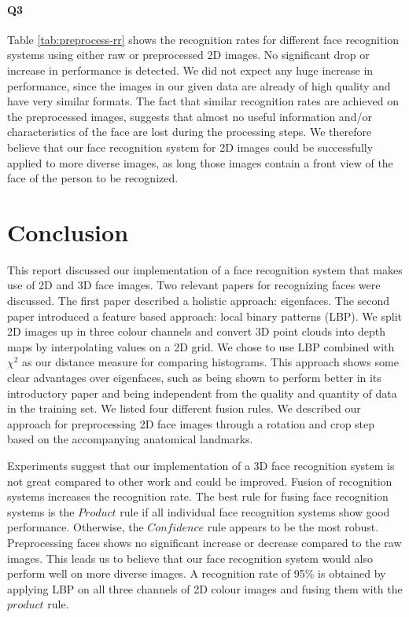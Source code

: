\documentclass[]{article}
\begin{document}
\paragraph{Q3}
Table \ref{tab:preprocess-rr} shows the recognition rates for different face recognition systems using either raw or preprocessed 2D images. No significant drop or increase in performance is detected. We did not expect any huge increase in performance, since the images in our given data are already of high quality and have very similar formats. The fact that similar recognition rates are achieved on the preprocessed images, suggests that almost no useful information and/or characteristics of the face are lost during the processing steps. We therefore believe that our face recognition system for 2D images could be successfully applied to more diverse images, as long those images contain a front view of the face of the person to be recognized.

\section{Conclusion}
This report discussed our implementation of a face recognition system that makes use of 2D and 3D face images. Two relevant papers for recognizing faces were discussed. The first paper described a holistic approach: eigenfaces. The second paper introduced a feature based approach: local binary patterns (LBP). We split 2D images up in three colour channels and convert 3D point clouds into depth maps by interpolating values on a 2D grid. We chose to use LBP combined with $\chi^2$ as our distance measure for comparing histograms. This approach shows some clear advantages over eigenfaces, such as being shown to perform better in its introductory paper and being independent from the quality and quantity of data in the training set. We listed four different fusion rules. We described our approach for preprocessing 2D face images through a rotation and crop step based on the accompanying anatomical landmarks.

Experiments suggest that our implementation of a 3D face recognition system is not great compared to other work and could be improved. Fusion of recognition systems increases the recognition rate. The best rule for fusing face recognition systems is the $Product$ rule if all individual face recognition systems show good performance. Otherwise, the $Confidence$ rule appears to be the most robust. Preprocessing faces shows no significant increase or decrease compared to the raw images. This leads us to believe that our face recognition system would also perform well on more diverse images. A recognition rate of 95\% is obtained by applying LBP on all three channels of 2D colour images and fusing them with the $product$ rule.


\end{document}
